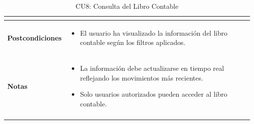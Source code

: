 \documentclass{article}
\begin{document}
\begin{longtable}{|l|p{10cm}|}
\begin{itemize}
\end{itemize} \\ \hline
\textbf{Postcondiciones} & 
\begin{itemize}
    \item El usuario ha visualizado la información del libro contable según los filtros aplicados.
\end{itemize} \\ \hline
\textbf{Notas} & 
\begin{itemize}
    \item La información debe actualizarse en tiempo real reflejando los movimientos más recientes.
    \item Solo usuarios autorizados pueden acceder al libro contable.
\end{itemize} \\ \hline
\caption{CU8: Consulta del Libro Contable}
\end{longtable}

\newpage
\end{document}
